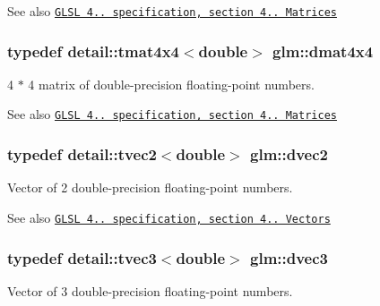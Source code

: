 \begin{DoxySeeAlso}{\-See also}
\href{http://www.opengl.org/registry/doc/GLSLangSpec.4.20.8.pdf}{\tt \-G\-L\-S\-L 4.. specification, section 4.. \-Matrices} 
\end{DoxySeeAlso}
\hypertarget{group__core__types_gaa505ead5e0b6d8bc504ccfeadbac83d5}{
\subsubsection[{dmat4x4}]{\setlength{\rightskip}{0pt plus 5cm}typedef detail\-::tmat4x4$<$double$>$ {\bf glm\-::dmat4x4}}}\label{group__core__types_gaa505ead5e0b6d8bc504ccfeadbac83d5}
4 $\ast$ 4 matrix of double-\/precision floating-\/point numbers.

\begin{DoxySeeAlso}{\-See also}
\href{http://www.opengl.org/registry/doc/GLSLangSpec.4.20.8.pdf}{\tt \-G\-L\-S\-L 4.. specification, section 4.. \-Matrices} 
\end{DoxySeeAlso}
\hypertarget{group__core__types_gad9953f484cbb104e8675653ce61900cb}{
\subsubsection[{dvec2}]{\setlength{\rightskip}{0pt plus 5cm}typedef detail\-::tvec2$<$double$>$ {\bf glm\-::dvec2}}}\label{group__core__types_gad9953f484cbb104e8675653ce61900cb}
\-Vector of 2 double-\/precision floating-\/point numbers.

\begin{DoxySeeAlso}{\-See also}
\href{http://www.opengl.org/registry/doc/GLSLangSpec.4.20.8.pdf}{\tt \-G\-L\-S\-L 4.. specification, section 4.. \-Vectors} 
\end{DoxySeeAlso}
\hypertarget{group__core__types_ga140a8656fbb8b19382f109c5d5869856}{
\subsubsection[{dvec3}]{\setlength{\rightskip}{0pt plus 5cm}typedef detail\-::tvec3$<$double$>$ {\bf glm\-::dvec3}}}\label{group__core__types_ga140a8656fbb8b19382f109c5d5869856}
\-Vector of 3 double-\/precision floating-\/point numbers.


